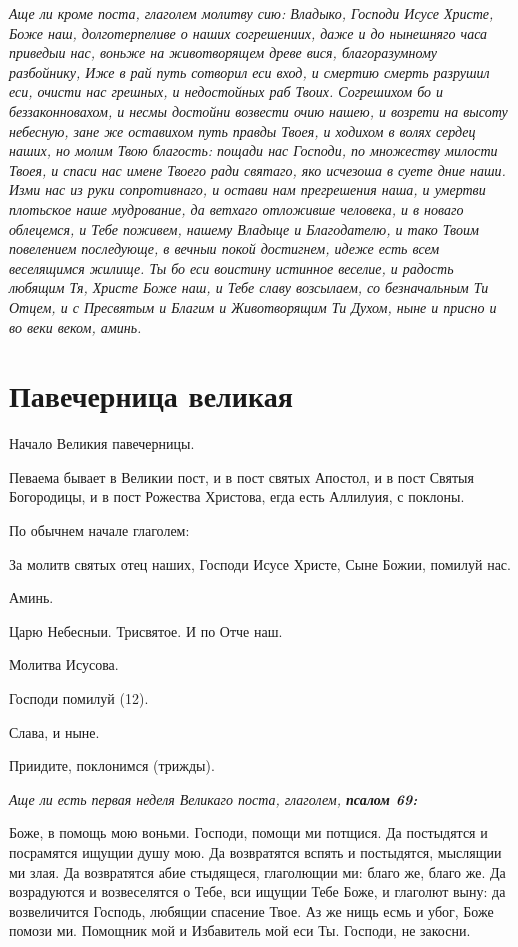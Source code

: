 \itshape Аще ли кроме поста, глаголем молитву сию:\normalfont{} Владыко, Господи Исусе Христе, Боже наш, долготерпеливе о наших согрешениих, даже и до нынешняго часа приведыи нас, воньже на животворящем древе вися, благоразумному разбойнику, Иже в рай путь сотворил еси вход, и смертию смерть разрушил еси, очисти нас грешных, и недостойных раб Твоих. Согрешихом бо и беззаконновахом, и несмы достойни возвести очию нашею, и возрети на высоту небесную, зане же оставихом путь правды Твоея, и ходихом в волях сердец наших, но молим Твою благость: пощади нас Господи, по множеству милости Твоея, и спаси нас имене Твоего ради святаго, яко исчезоша в суете дние наши. Изми нас из руки сопротивнаго, и остави нам прегрешения наша, и умертви плотьское наше мудрование, да ветхаго отложивше человека, и в новаго облецемся, и Тебе поживем, нашему Владыце и Благодателю, и тако Твоим повелением последующе, в вечныи покой достигнем, идеже есть всем веселящимся жилище. Ты бо еси воистину истинное веселие, и радость любящим Тя, Христе Боже наш, и Тебе славу возсылаем, со безначальным Ти Отцем, и с Пресвятым и Благим и Животворящим Ти Духом, ныне и присно и во веки веком, аминь.


\section{Павечерница великая}
 


Начало Великия павечерницы. 

Певаема бывает в Великии пост, и в пост святых Апостол, и в пост Святыя Богородицы, и в пост Рожества Христова, егда есть Аллилуия, с поклоны.

По обычнем начале глаголем:

За молитв святых отец наших, Господи Исусе Христе, Сыне Божии, помилуй нас.

Аминь.

Царю Небесныи. Трисвятое. И по Отче наш. 

Молитва Исусова. 

Господи помилуй (12).

Слава, и ныне. 

Приидите, поклонимся (трижды).


\medskip


\itshape Аще ли есть первая неделя Великаго поста, глаголем, \bfseries псалом 69:\normalfont{}\normalfont{}


Боже, в помощь мою воньми. Господи, помощи ми потщися. Да постыдятся и посрамятся ищущии душу мою. Да возвратятся вспять и постыдятся, мыслящии ми злая. Да возвратятся абие стыдящеся, глаголющии ми: благо же, благо же. Да возрадуются и возвеселятся о Тебе, вси ищущии Тебе Боже, и глаголют выну: да возвеличится Господь, любящии спасение Твое. Аз же нищь есмь и убог, Боже помози ми. Помощник мой и Избавитель мой еси Ты. Господи, не закосни.

